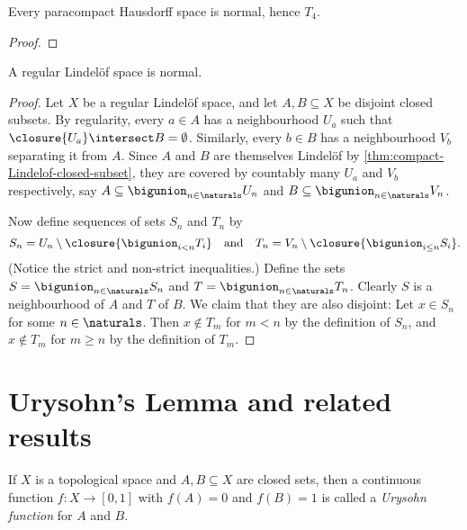 \documentclass[article, a4paper, 11pt, oneside]{memoir}
\numberwithin{equation}{chapter}
\begin{document}
\begin{proposition}
    \label{thm:paracompact-Hausdorff-is-normal}
    Every paracompact Hausdorff space is normal, hence $T_4$.
\end{proposition}

\begin{proof}
    
\end{proof}


\begin{proposition}
    A regular Lindelöf space is normal.
\end{proposition}

\begin{proof}
    Let $X$ be a regular Lindelöf space, and let $A,B \subseteq X$ be disjoint closed subsets. By regularity, every $a \in A$ has a neighbourhood $U_a$ such that $\closure{U_a} \intersect B = \emptyset$. Similarly, every $b \in B$ has a neighbourhood $V_b$ separating it from $A$. Since $A$ and $B$ are themselves Lindelöf by \cref{thm:compact-Lindelof-closed-subset}, they are covered by countably many $U_a$ and $V_b$ respectively, say $A \subseteq \bigunion_{n \in \naturals} U_n$ and $B \subseteq \bigunion_{n \in \naturals} V_n$.

    Now define sequences of sets $S_n$ and $T_n$ by
    \begin{equation*}
        S_n = U_n \setminus \closure{ \bigunion_{i < n} T_i}
        \quad \text{and} \quad
        T_n = V_n \setminus \closure{ \bigunion_{i \leq n} S_i}.
    \end{equation*}
    (Notice the strict and non-strict inequalities.) Define the sets $S = \bigunion_{n \in \naturals} S_n$ and $T = \bigunion_{n \in \naturals} T_n$. Clearly $S$ is a neighbourhood of $A$ and $T$ of $B$. We claim that they are also disjoint: Let $x \in S_n$ for some $n \in \naturals$. Then $x \not\in T_m$ for $m < n$ by the definition of $S_n$, and $x \not\in T_m$ for $m \geq n$ by the definition of $T_m$. 
\end{proof}


\section{Urysohn's Lemma and related results}

If $X$ is a topological space and $A,B \subseteq X$ are closed sets, then a continuous function $f \colon X \to [0,1]$ with $f(A) = 0$ and $f(B) = 1$ is called a \emph{Urysohn function} for $A$ and $B$.
\end{document}
